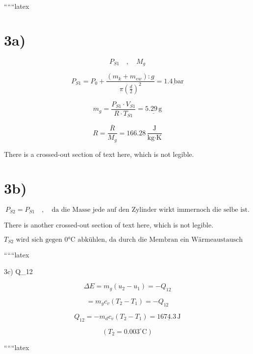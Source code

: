 
``````latex


\section*{3a)}

\[
P_{S1} \quad , \quad M_{g}
\]

\[
P_{S1} = P_{0} + \frac{(m_{k} + m_{ew}): g}{\pi \left( \frac{d}{2} \right)^{2}} = \underline{1.4 \, \text{bar}}
\]

\[
m_{g} = \frac{P_{S1} \cdot V_{S1}}{R \cdot T_{S1}} = \underline{5.29 \, \text{g}}
\]

\[
R = \frac{\overline{R}}{M_{g}} = 166.28 \, \frac{\text{J}}{\text{kg} \cdot \text{K}}
\]

\noindent
There is a crossed-out section of text here, which is not legible.

\section*{3b)}

\[
P_{S2} = P_{S1} \quad , \quad \text{da die Masse jede auf den Zylinder wirkt immernoch die selbe ist.}
\]

\noindent
There is another crossed-out section of text here, which is not legible.

\[
T_{S2} \text{ wird sich gegen 0°C abkühlen, da durch die Membran ein Wärmeaustausch stattfindet.}
\]

``````latex

3c) \quad Q_{12}

\[
\Delta E = m_g (u_2 - u_1) = -Q_{12}
\]

\[
= m_g c_v (T_2 - T_1) = -Q_{12}
\]

\[
Q_{12} = -m_d c_v (T_2 - T_1) = \underline{1674.3 \, \text{J}}
\]

\[
(T_2 = 0.003^\circ \text{C})
\]

``````latex


